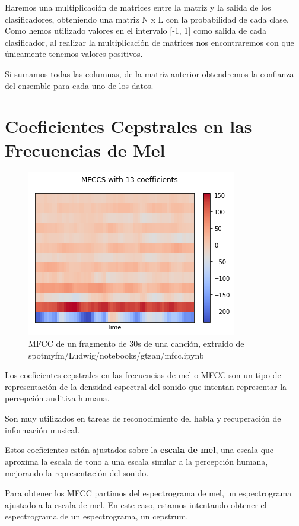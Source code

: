 Haremos una multiplicación de matrices entre la matriz y la salida de
los clasificadores, obteniendo una matriz N x L con la probabilidad de
cada clase. Como hemos utilizado valores en el intervalo {[}-1, 1{]}
como salida de cada clasificador, al realizar la multiplicación de
matrices nos encontraremos con que únicamente tenemos valores positivos.

Si sumamos todas las columnas, de la matriz anterior obtendremos la
confianza del ensemble para cada uno de los datos.


\hypertarget{coeficientes-cepstrales-en-las-frecuencias-de-mel}{%
\section{Coeficientes Cepstrales en las Frecuencias de
Mel}\label{coeficientes-cepstrales-en-las-frecuencias-de-mel}}


\begin{figure}
    \centering
    \includegraphics{img/3/mfcc.png}
    \caption{MFCC de un fragmento de 30s de una canción, extraido de spotmyfm/Ludwig/notebooks/gtzan/mfcc.ipynb}
    \label{fig:my_label}
\end{figure}
Los coeficientes cepstrales en las frecuencias de mel o MFCC son un tipo
de representación de la densidad espectral del sonido que intentan
representar la percepción auditiva humana.

Son muy utilizados en tareas de reconocimiento del habla y recuperación
de información musical.

Estos coeficientes están ajustados sobre la \textbf{escala de mel}, una
escala que aproxima la escala de tono a una escala similar a la
percepción humana, mejorando la representación del sonido.

Para obtener los MFCC partimos del espectrograma de mel, un
espectrograma ajustado a la escala de mel. En este caso, estamos
intentando obtener el espectrograma de un espectrograma, un cepstrum.

